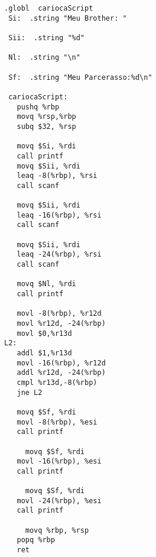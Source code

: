 \documentclass{article}
\begin{document}
\begin{lstlisting}
.globl  cariocaScript
 Si:  .string "Meu Brother: "

 Sii:  .string "%d"

 Nl:  .string "\n"

 Sf:  .string "Meu Parcerasso:%d\n"

 cariocaScript:
   pushq %rbp
   movq %rsp,%rbp
   subq $32, %rsp

   movq $Si, %rdi
   call printf
   movq $Sii, %rdi
   leaq -8(%rbp), %rsi
   call scanf

   movq $Sii, %rdi
   leaq -16(%rbp), %rsi
   call scanf

   movq $Sii, %rdi
   leaq -24(%rbp), %rsi
   call scanf

   movq $Nl, %rdi
   call printf

   movl -8(%rbp), %r12d 
   movl %r12d, -24(%rbp) 
   movl $0,%r13d
L2:
   addl $1,%r13d 
   movl -16(%rbp), %r12d 
   addl %r12d, -24(%rbp) 
   cmpl %r13d,-8(%rbp)
   jne L2

   movq $Sf, %rdi
   movl -8(%rbp), %esi
   call printf

	 movq $Sf, %rdi
   movl -16(%rbp), %esi
   call printf

	 movq $Sf, %rdi
   movl -24(%rbp), %esi
   call printf

	 movq %rbp, %rsp
   popq %rbp
   ret
\end{lstlisting}
\end{document}
